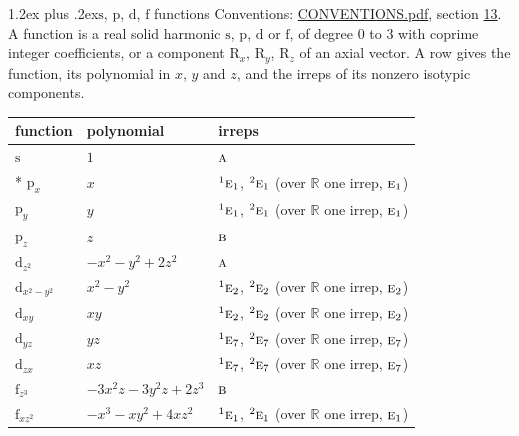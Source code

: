 \documentclass[10pt,a4paper]{article}
\makeatletter
\renewcommand\section{\@startsection{section}{1}{\z@}{-3ex plus -1ex minus -.2ex}%
  {1.2ex plus .2ex}{\normalfont\large\sffamily\bfseries\color{parttitle}}}
\numberwithin{equation}{section}
\newcommand{\irr}[1]{\text{\normalfont\scshape #1}}
\newcommand{\conjpair}[1]{{}^{#1}}
\newcommand{\orbital}[1]{\mathrm{#1}}
\makeatother
\begin{document}
\section{\texorpdfstring{$\orbital{s}$, $\orbital{p}$, $\orbital{d}$, $\orbital{f}$}{s, p, d, f} functions}\label{s:orbitals}
Conventions: \href{../../CONVENTIONS.pdf}{CONVENTIONS.pdf}, section \href{../../CONVENTIONS.pdf\#conv.13}{13}.
\leavevmode\label{n:head.function}A function is a real solid harmonic $\orbital{s}$, $\orbital{p}$, $\orbital{d}$ or $\orbital{f}$, of degree 0 to 3 with coprime integer coefficients, or a component $\orbital{R}_{x}$, $\orbital{R}_{y}$, $\orbital{R}_{z}$ of an axial vector. \label{n:head.polynomial}\label{n:head.irreps}A row gives the function, its polynomial in $x$, $y$ and $z$, and the irreps of its nonzero isotypic components.
{\small\begin{longtable}{@{}lll@{}}\toprule
function & polynomial & irreps\\\midrule\endhead
\bottomrule\endfoot\endlastfoot
$\orbital{s}$ & $1$ & $\irr{a}$\\*
$\orbital{p}_{x}$ & $x$ & $\conjpair{1}\irr{e}_{1}$, $\conjpair{2}\irr{e}_{1}$ (over $\mathbb{R}$ one irrep, $\irr{e}_{1}$)\\
$\orbital{p}_{y}$ & $y$ & $\conjpair{1}\irr{e}_{1}$, $\conjpair{2}\irr{e}_{1}$ (over $\mathbb{R}$ one irrep, $\irr{e}_{1}$)\\
$\orbital{p}_{z}$ & $z$ & $\irr{b}$\\
$\orbital{d}_{z^2}$ & $-x^{2} - y^{2} + 2z^{2}$ & $\irr{a}$\\
$\orbital{d}_{x^2-y^2}$ & $x^{2} - y^{2}$ & $\conjpair{1}\irr{e}_{2}$, $\conjpair{2}\irr{e}_{2}$ (over $\mathbb{R}$ one irrep, $\irr{e}_{2}$)\\
$\orbital{d}_{xy}$ & $xy$ & $\conjpair{1}\irr{e}_{2}$, $\conjpair{2}\irr{e}_{2}$ (over $\mathbb{R}$ one irrep, $\irr{e}_{2}$)\\
$\orbital{d}_{yz}$ & $yz$ & $\conjpair{1}\irr{e}_{7}$, $\conjpair{2}\irr{e}_{7}$ (over $\mathbb{R}$ one irrep, $\irr{e}_{7}$)\\
$\orbital{d}_{zx}$ & $xz$ & $\conjpair{1}\irr{e}_{7}$, $\conjpair{2}\irr{e}_{7}$ (over $\mathbb{R}$ one irrep, $\irr{e}_{7}$)\\
$\orbital{f}_{z^3}$ & $-3x^{2}z - 3y^{2}z + 2z^{3}$ & $\irr{b}$\\
$\orbital{f}_{xz^2}$ & $-x^{3} - xy^{2} + 4xz^{2}$ & $\conjpair{1}\irr{e}_{1}$, $\conjpair{2}\irr{e}_{1}$ (over $\mathbb{R}$ one irrep, $\irr{e}_{1}$)\\

\end{longtable}}
\end{document}
